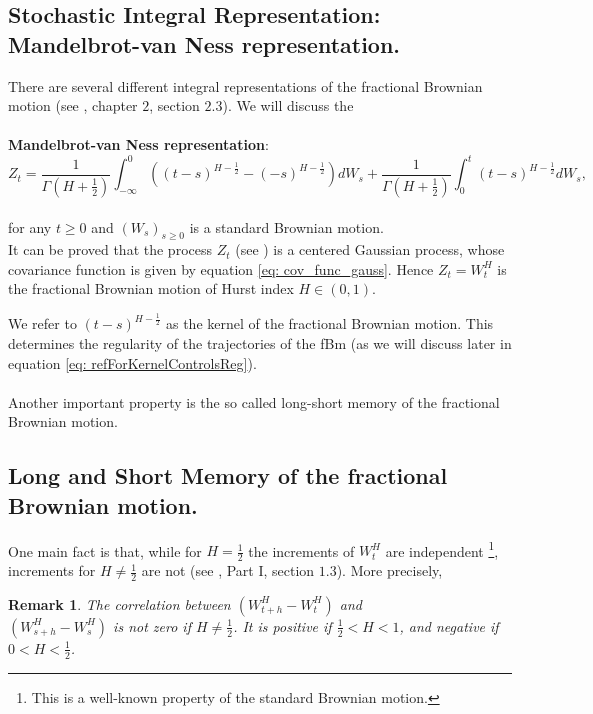 \documentclass[a4paper,italian,11pt]{book}
\newtheorem{remark}{Remark}
\theoremstyle{plain}
\theoremstyle{remark}
\theoremstyle{plain}
\begin{document}
\subsection{Stochastic Integral Representation: Mandelbrot-van Ness representation.}
\label{subsection: mandelbrotvanness}

There are several different integral representations of the fractional Brownian motion (see \cite{NourdinIvan}, chapter $2$, section $2.3$). We will discuss the
\\
\\
\textbf{Mandelbrot-van Ness representation}:
\begin{equation}
    \label{eq: mandelbroFBM}
    Z_t = \frac{1}{\Gamma(H+\frac{1}{2})} \int_{-\infty}^0((t-s)^{H-\frac{1}{2}} - (-s)^{H-\frac{1}{2}})dW_s + \frac{1}{\Gamma(H+\frac{1}{2})} \int_0^t(t-s)^{H-\frac{1}{2}}dW_s,
\end{equation}
\\
\noindent
for any $t\ge0$ and $(W_s)_{s\ge 0}$ is a standard Brownian motion. \\
It can be proved that the process $Z_t$ (see \cite{156!}) is a centered Gaussian process, whose covariance function is given by equation \eqref{eq: cov_func_gauss}. Hence $Z_t=W_t^H$ is the fractional Brownian motion of Hurst index $H\in (0,1)$.

We refer to $(t-s)^{H-\frac{1}{2}}$ as the kernel of the fractional Brownian motion. This determines the regularity of the trajectories of the fBm (as we will discuss later in equation \eqref{eq: refForKernelControlsReg}). 
\\
\\
Another important property is the so called long-short memory of the fractional Brownian motion.

\subsection{Long and Short Memory of the fractional Brownian motion.}

One main fact is that, while for $H=\frac{1}{2}$ the increments of $W^H_t$ are independent \footnote{This is a well-known property of the standard Brownian motion.}, increments for $H\ne \frac{1}{2}$ are not (see \cite{ZhangBook}, Part I, section $1.3$).
More precisely, 

\begin{remark}
The correlation between $\left( W^H_{t+h}-W^H_t\right)$ and \\
$\left( W^H_{s+h}-W^H_s\right)$ is not zero if $H\ne \frac{1}{2}$. It is positive if $\frac{1}{2}<H<1$, and negative if $0<H<\frac{1}{2}$.
\end{remark}
\end{document}
